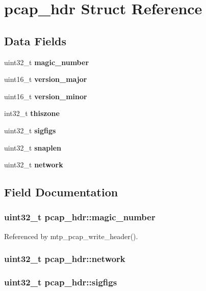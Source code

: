 \section{pcap\+\_\+hdr Struct Reference}
\label{structpcap__hdr}
\subsection*{Data Fields}
\begin{DoxyCompactItemize}
\item 
uint32\+\_\+t {\bf magic\+\_\+number}
\item 
uint16\+\_\+t {\bf version\+\_\+major}
\item 
uint16\+\_\+t {\bf version\+\_\+minor}
\item 
int32\+\_\+t {\bf thiszone}
\item 
uint32\+\_\+t {\bf sigfigs}
\item 
uint32\+\_\+t {\bf snaplen}
\item 
uint32\+\_\+t {\bf network}
\end{DoxyCompactItemize}


\subsection{Field Documentation}
\subsubsection[{magic\+\_\+number}]{\setlength{\rightskip}{0pt plus 5cm}uint32\+\_\+t pcap\+\_\+hdr\+::magic\+\_\+number}\label{structpcap__hdr_a0a6ddfca366d3604a4f6bebe7a773f49}


Referenced by mtp\+\_\+pcap\+\_\+write\+\_\+header().

\subsubsection[{network}]{\setlength{\rightskip}{0pt plus 5cm}uint32\+\_\+t pcap\+\_\+hdr\+::network}\label{structpcap__hdr_a8e2ea0d080fa5de7f5a1ecd72b23af7f}
\subsubsection[{sigfigs}]{\setlength{\rightskip}{0pt plus 5cm}uint32\+\_\+t pcap\+\_\+hdr\+::sigfigs}\label{structpcap__hdr_a99edd49104642a2b52ee74ef83582fe0}
